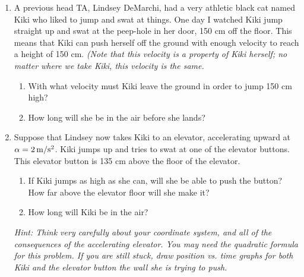 \documentclass[12pt]{article}
\begin{document}
\begin{enumerate}
		\newpage

\item A previous head TA, Lindsey DeMarchi, had a very athletic black cat named Kiki who liked to jump and swat at things. One day I watched Kiki jump straight up and swat at the peep-hole in her door, 150 cm off the floor.
	This means that Kiki can push herself off the ground with enough velocity to reach a height of 150 cm. {\it (Note that this velocity is a property of Kiki herself; no matter where we take Kiki, this velocity is the same.}

\begin{enumerate}
\item With what velocity must Kiki leave the ground in order to jump 150 cm high?
\item How long will she be in the air before she lands?
\end{enumerate}

\item Suppose that Lindsey now takes Kiki to an elevator, accelerating upward at $\alpha=2\, \rm m/\rm s^2$. Kiki jumps up and tries to swat at one of the elevator buttons. This elevator button is 135 cm above the floor of the 
	elevator.

\begin{enumerate}
\item If Kiki jumps as high as she can, will she be able to push the button? How far above the elevator floor will she make it?
\item How long will Kiki be in the air?
\end{enumerate}

{\it Hint: Think very carefully about your coordinate system, and all of the consequences of the accelerating elevator. You may need the quadratic formula for this problem. If you are still stuck, draw position vs. time graphs for 
		both Kiki and the elevator button the wall she is trying to push.}


\end{enumerate}
\end{document}

